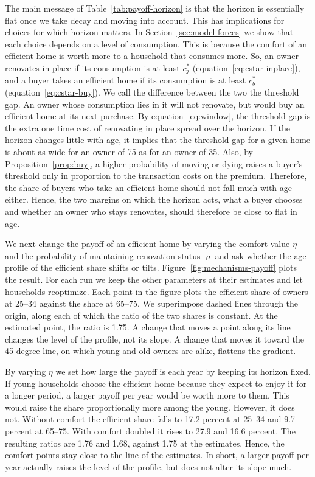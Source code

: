 The main message of Table~\ref{tab:payoff-horizon} is that the horizon is essentially flat once we take decay and moving into account. This has implications for choices for which horizon matters. In Section~\ref{sec:model-forces} we show that each
choice depends on a level of consumption. This is because the comfort of an efficient
home is worth more to a household that consumes more. So, an owner renovates in
place if its consumption is at least $c_j^*$
(equation~\eqref{eq:cstar-inplace}), and a buyer takes an efficient home if
its consumption is at least $c_b^*$ (equation~\eqref{eq:cstar-buy}). We call
the difference between the two the threshold gap. An owner whose consumption
lies in it will not renovate, but would buy an efficient home at its next
purchase. By equation~\eqref{eq:window}, the threshold gap is the extra
one time cost of renovating in place spread over the horizon.
If the horizon changes little with age, it implies that the threshold gap for a given home is about as wide
for an owner of 75 as for an owner of 35. Also, by
Proposition~\ref{prop:buy}, a higher probability of moving or dying raises
a buyer's threshold only in proportion to the transaction costs on the
premium. Therefore, the share of buyers who take an efficient home should not fall
much with age either. Hence, the two margins on which the horizon acts, what a
buyer chooses and whether an owner who stays renovates, should therefore be
close to flat in age. 



We next change the payoff of an efficient home by varying the comfort value $\eta$ and the probability of maintaining renovation status $\varrho$ and ask whether
the age profile of the efficient share shifts or tilts.
Figure~\ref{fig:mechanisms-payoff} plots the result. For each run we keep the other parameters at their
estimates and let households reoptimize. Each point in the figure plots the efficient
share of owners at 25--34 against the share at 65--75.  We superimpose dashed lines through the origin, along each of which the ratio of the two shares is constant. At the estimated point, the ratio is 1.75. A change that moves a point along its
line changes the level of the profile, not its slope. A change that moves it
toward the 45-degree line, on which young and old owners are alike, flattens
the gradient.

By varying  $\eta$ we set how large the payoff is each year by keeping its horizon fixed. If  young households choose the efficient home because  they expect to
enjoy it for a longer period, a larger payoff per year would be worth more to them. This would raise the share proportionally more among the young. However, it does not.
Without comfort the efficient share falls to 17.2 percent at 25--34 and 9.7
percent at 65--75. With comfort doubled it rises to 27.9 and 16.6 percent.
The resulting ratios are 1.76 and 1.68, against 1.75 at the estimates. Hence, the comfort
points stay close to the line of the estimates. In short, a larger payoff per year
actually raises the level of the profile, but does not alter its slope much.

